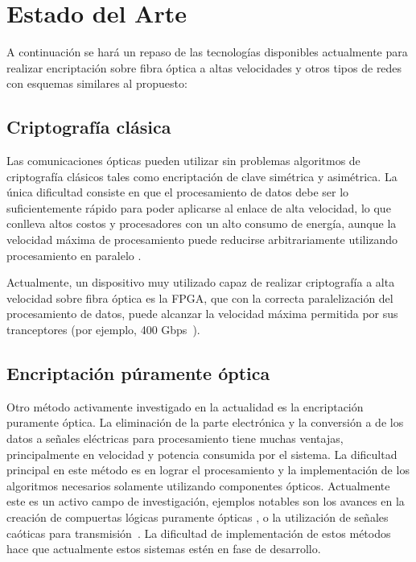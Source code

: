 \section{Estado del Arte}

A continuación se hará un repaso de las tecnologías disponibles actualmente para realizar encriptación sobre fibra óptica a altas velocidades y otros tipos de redes con esquemas similares al propuesto:

\subsection{Criptografía clásica}
Las comunicaciones ópticas pueden utilizar sin problemas algoritmos de criptografía clásicos tales como encriptación de clave simétrica y asimétrica. La única dificultad consiste en que el procesamiento de datos debe ser lo suficientemente rápido para poder aplicarse al enlace de alta velocidad, lo que conlleva altos costos y procesadores con un alto consumo de energía, aunque la velocidad máxima de procesamiento puede reducirse arbitrariamente utilizando procesamiento en paralelo \cite{liforward}.

Actualmente, un dispositivo muy utilizado capaz de realizar criptografía a alta velocidad sobre fibra óptica es la FPGA, que con la correcta paralelización del procesamiento de datos, puede alcanzar la velocidad máxima permitida por sus tranceptores (por ejemplo, 400 Gbps~\cite{Algotronix}).

\subsection{Encriptación púramente óptica}
\label{optocry}
Otro método activamente investigado en la actualidad es la encriptación puramente óptica. La eliminación de la parte electrónica y la conversión a de los datos a señales eléctricas para procesamiento tiene muchas ventajas, principalmente en velocidad y potencia consumida por el sistema.
La dificultad principal en este método es en lograr el procesamiento y la implementación de los algoritmos necesarios solamente utilizando componentes ópticos. Actualmente este es un activo campo de investigación, ejemplos notables son los avances en la creación de compuertas lógicas puramente ópticas \cite{jung2008demonstration}, o la utilización de señales caóticas para transmisión~\cite{liu2002synchronized}.
La dificultad de implementación de estos métodos hace que actualmente estos sistemas estén en fase de desarrollo.

